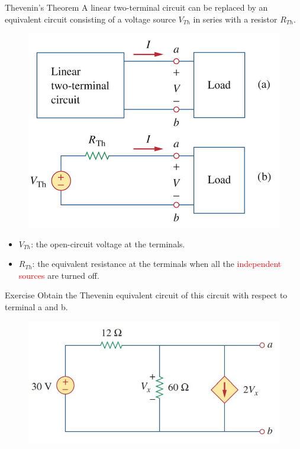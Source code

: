 \documentclass{beamer}
\begin{document}
\begin{frame}{Thevenin’s Theorem}
A linear two-terminal circuit can be replaced by an equivalent circuit consisting of a voltage source $V_{Th}$ in series with a resistor $R_{Th}$.

\begin{figure}
\centering
\includegraphics[scale=0.3]{img_cir/7.png}
\end{figure}

\begin{itemize}
\item $V_{Th}$: the open-circuit voltage at the terminals.
\item $R_{Th}$: the equivalent resistance at the terminals when all the \textcolor{red}{independent sources} are turned off.
\end{itemize}
\end{frame}


\begin{frame}{Exercise}
Obtain the Thevenin equivalent circuit of this circuit with respect to terminal a and b.
\begin{figure}
\centering
\includegraphics[scale=0.5]{img_cir/8.png}
\end{figure}
\end{frame}
\end{document}
